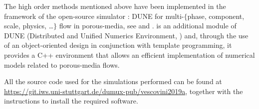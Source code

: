 The high order methods mentioned above have been implemented in the framework 
of the open-source simulator \DUMUX: DUNE for multi-$\{$phase, component, 
scale, physics, \dots$\}$ flow in porous-media, see \cite{dumux:tutti} and 
\cite{dumux:flemisch}. \DUMUX is an 
additional module of DUNE (Distributed and Unified Numerics Environment, 
\cite{web:dune}) and, through the use of an object-oriented design in 
conjunction with template programming, it provides a C++ environment that 
allows an efficient implementation of numerical models related to porous-media 
flows.

All the source code used for the simulations performed can be 
found at \url{https://git.iws.uni-stuttgart.de/dumux-pub/vescovini2019a}, 
together with the instructions to install the required software.